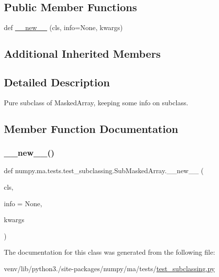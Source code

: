 \subsection*{Public Member Functions}
\begin{DoxyCompactItemize}
\item 
def \hyperlink{classnumpy_1_1ma_1_1tests_1_1test__subclassing_1_1SubMaskedArray_a58730fc50879d9df394abb22ebc86af3}{\+\_\+\+\_\+new\+\_\+\+\_\+} (cls, info=None, kwargs)
\end{DoxyCompactItemize}
\subsection*{Additional Inherited Members}


\subsection{Detailed Description}
\begin{DoxyVerb}Pure subclass of MaskedArray, keeping some info on subclass.\end{DoxyVerb}
 

\subsection{Member Function Documentation}
\mbox{\label{classnumpy_1_1ma_1_1tests_1_1test__subclassing_1_1SubMaskedArray_a58730fc50879d9df394abb22ebc86af3}} 
\subsubsection{\texorpdfstring{\+\_\+\+\_\+new\+\_\+\+\_\+()}{\_\_new\_\_()}}
{\footnotesize\ttfamily def numpy.\+ma.\+tests.\+test\+\_\+subclassing.\+Sub\+Masked\+Array.\+\_\+\+\_\+new\+\_\+\+\_\+ (\begin{DoxyParamCaption}\item[{}]{cls,  }\item[{}]{info = {\ttfamily None},  }\item[{}]{kwargs }\end{DoxyParamCaption})}



The documentation for this class was generated from the following file\+:\begin{DoxyCompactItemize}
\item 
venv/lib/python3./site-\/packages/numpy/ma/tests/\hyperlink{test__subclassing_8py}{test\+\_\+subclassing.\+py}\end{DoxyCompactItemize}
